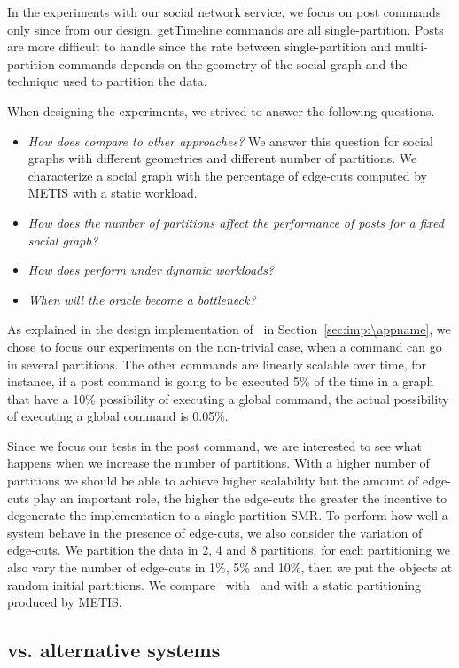 In the experiments with our social network service, we focus on post commands only since from our design, getTimeline commands are all single-partition.
Posts are more difficult to handle since the rate between single-partition and multi-partition commands depends on the geometry of the social graph and the technique used to partition the data.

When designing the experiments, we strived to answer the following questions.
\begin{itemize}
\item \emph{How does \dynastar compare to other approaches?} 
We answer this question for social graphs with different geometries and different number of partitions.
We characterize a social graph with the percentage of edge-cuts computed by METIS with a static workload.
\item \emph{How does the number of partitions affect the performance of posts for a fixed social graph?}
\item \emph{How does \dynastar perform under dynamic workloads?}
\item \emph{When will the oracle become a bottleneck?}
\end{itemize}

As explained in the design implementation of \appname\ in Section~\ref{sec:imp:\appname}, we chose to focus our
experiments on the non-trivial case, when a command can go in several partitions. The other commands are linearly
scalable over time, for instance, if a post command is going to be executed 5\% of the time in a graph that have a 10\%
possibility of executing a global command, the actual possibility of executing a global command is 0.05\%.

Since we focus our tests in the post command, we are interested to see what happens when we increase the number of
partitions. With a higher number of partitions we should be able to achieve higher scalability but the amount of edge-cuts
play an important role, the higher the edge-cuts the greater the incentive to degenerate the implementation to a single
partition SMR. To perform how well a system behave in the presence of edge-cuts, we also consider the variation of
edge-cuts. We partition the data in 2, 4 and 8 partitions, for each partitioning we also vary the number of edge-cuts 
in 1\%, 5\% and 10\%, then we put the objects at random initial partitions. We compare \dynastar\ with \dssmr\ and \ssmr with a static partitioning produced by METIS.

\subsection{\dynastar vs. alternative systems}
\label{sec:evaluation:results}

